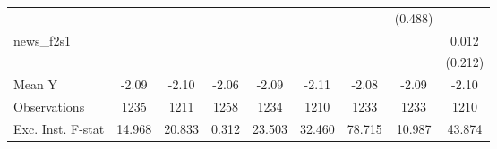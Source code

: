 {\begin{tabular}{l*{8}{c}}
            &                     &                     &                     &                     &                     &                     &     (0.488)         &                     \\
\addlinespace
news\_f2s1   &                     &                     &                     &                     &                     &                     &                     &       0.012         \\
            &                     &                     &                     &                     &                     &                     &                     &     (0.212)         \\
\midrule
Mean Y      &       -2.09         &       -2.10         &       -2.06         &       -2.09         &       -2.11         &       -2.08         &       -2.09         &       -2.10         \\
Observations&        1235         &        1211         &        1258         &        1234         &        1210         &        1233         &        1233         &        1210         \\
Exc. Inst. F-stat&      14.968         &      20.833         &       0.312         &      23.503         &      32.460         &      78.715         &      10.987         &      43.874         \\
\bottomrule
\end{tabular}
}
